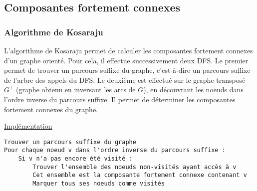 \documentclass[11pt,a4paper]{article}
\begin{document}
  \subsection{Composantes fortement connexes}

    \subsubsection{Algorithme de Kosaraju}
L'algorithme de Kosaraju permet de calculer les composantes fortement connexes d'un graphe orienté. Pour cela, il effectue successivement deux DFS. Le premier permet de trouver un parcours suffixe du graphe, c'est-à-dire un parcours suffixe de l'arbre des appels du DFS. Le deuxième est effectué sur le graphe transposé \(G^\top\) (graphe obtenu en inversant les arcs de \(G\)), en découvrant les noeuds dans l'ordre inverse du parcours suffixe. Il permet de déterminer les composantes fortement connexes du graphe.

\noindent\href{https://github.com/AdrienVannson/algo-lib/blob/master/include/graphs/algorithms/kosaraju.hpp}{Implémentation}
\begin{lstlisting}
Trouver un parcours suffixe du graphe
Pour chaque noeud v dans l'ordre inverse du parcours suffixe :
    Si v n'a pas encore été visité :
        Trouver l'ensemble des noeuds non-visités ayant accès à v
        Cet ensemble est la composante fortement connexe contenant v
        Marquer tous ses noeuds comme visités
\end{lstlisting}
\end{document}
